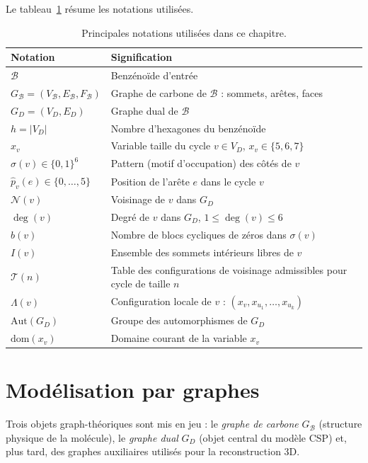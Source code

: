 \documentclass[12pt,a4paper]{article}
\theoremstyle{definition}
\theoremstyle{remark}
\newcommand{\B}{\mathcal{B}}
\newcommand{\GD}{G_{\!D}}
\newcommand{\GB}{G_{\!\B}}
\newcommand{\VD}{V_{\!D}}
\newcommand{\ED}{E_{\!D}}
\newcommand{\xv}{x_v}
\newcommand{\degv}{\deg(v)}
\newcommand{\Tn}{\mathcal{T}(n)}
\newcommand{\posIn}[2]{\hat{p}_{#1}(#2)}
\newcommand{\Aut}{\mathrm{Aut}}
\newcommand{\dom}{\mathrm{dom}}
\newcommand{\NN}{\mathcal{N}}
\begin{document}
Le tableau~\ref{tab:notations} r\'esume les notations utilis\'ees.

\begin{table}[!ht]
\centering
\renewcommand{\arraystretch}{1.25}
\begin{tabular}{@{}lp{10.5cm}@{}}
\toprule
\textbf{Notation} & \textbf{Signification} \\
\midrule
$\B$ & Benz\'eno\"ide d'entr\'ee \\
$\GB = (V_\B, E_\B, F_\B)$ & Graphe de carbone de $\B$ : sommets, ar\^etes, faces \\
$\GD = (\VD, \ED)$ & Graphe dual de $\B$ \\
$h = |\VD|$ & Nombre d'hexagones du benz\'eno\"ide \\
$\xv$ & Variable taille du cycle $v \in \VD$, $\xv \in \{5,6,7\}$ \\
$\sigma(v) \in \{0,1\}^6$ & Pattern (motif d'occupation) des c\^ot\'es de $v$ \\
$\posIn{v}{e} \in \{0,\ldots,5\}$ & Position de l'ar\^ete $e$ dans le cycle $v$ \\
$\NN(v)$ & Voisinage de $v$ dans $\GD$ \\
$\degv$ & Degr\'e de $v$ dans $\GD$, $1 \leq \degv \leq 6$ \\
$b(v)$ & Nombre de blocs cycliques de z\'eros dans $\sigma(v)$ \\
$I(v)$ & Ensemble des sommets int\'erieurs libres de $v$ \\
$\Tn$ & Table des configurations de voisinage admissibles pour cycle de taille $n$ \\
$\Lambda(v)$ & Configuration locale de $v$ : $(\xv, x_{u_1}, \ldots, x_{u_k})$ \\
$\Aut(\GD)$ & Groupe des automorphismes de $\GD$ \\
$\dom(\xv)$ & Domaine courant de la variable $\xv$ \\
\bottomrule
\end{tabular}
\caption{Principales notations utilis\'ees dans ce chapitre.}
\label{tab:notations}
\end{table}

\section{Mod\'elisation par graphes}
\label{sec:modelisation-graphe}

Trois objets graph-th\'eoriques sont mis en jeu : le \emph{graphe de
carbone} $\GB$ (structure physique de la mol\'ecule), le \emph{graphe dual}
$\GD$ (objet central du mod\`ele CSP) et, plus tard, des graphes
auxiliaires utilis\'es pour la reconstruction 3D.
\end{document}
